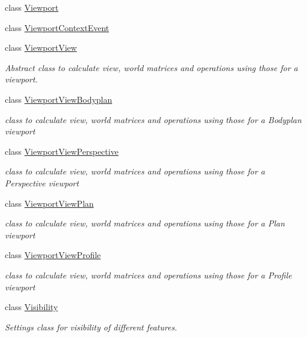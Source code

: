\begin{DoxyCompactItemize}
\item 
class \hyperlink{classShipCAD_1_1Viewport}{Viewport}
\item 
class \hyperlink{classShipCAD_1_1ViewportContextEvent}{Viewport\+Context\+Event}
\item 
class \hyperlink{classShipCAD_1_1ViewportView}{Viewport\+View}
\begin{DoxyCompactList}\small\item\em Abstract class to calculate view, world matrices and operations using those for a viewport. \end{DoxyCompactList}\item 
class \hyperlink{classShipCAD_1_1ViewportViewBodyplan}{Viewport\+View\+Bodyplan}
\begin{DoxyCompactList}\small\item\em class to calculate view, world matrices and operations using those for a Bodyplan viewport \end{DoxyCompactList}\item 
class \hyperlink{classShipCAD_1_1ViewportViewPerspective}{Viewport\+View\+Perspective}
\begin{DoxyCompactList}\small\item\em class to calculate view, world matrices and operations using those for a Perspective viewport \end{DoxyCompactList}\item 
class \hyperlink{classShipCAD_1_1ViewportViewPlan}{Viewport\+View\+Plan}
\begin{DoxyCompactList}\small\item\em class to calculate view, world matrices and operations using those for a Plan viewport \end{DoxyCompactList}\item 
class \hyperlink{classShipCAD_1_1ViewportViewProfile}{Viewport\+View\+Profile}
\begin{DoxyCompactList}\small\item\em class to calculate view, world matrices and operations using those for a Profile viewport \end{DoxyCompactList}\item 
class \hyperlink{classShipCAD_1_1Visibility}{Visibility}
\begin{DoxyCompactList}\small\item\em Settings class for visibility of different features. \end{DoxyCompactList}\end{DoxyCompactItemize}
